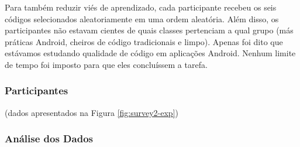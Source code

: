 Para também reduzir viés de aprendizado, cada participante recebeu os seis códigos selecionados aleatoriamente em uma ordem aleatória. Além disso, os participantes não estavam cientes de quais classes pertenciam a qual grupo (más práticas Android, cheiros de código tradicionais e limpo). Apenas foi dito que estávamos estudando qualidade de código em aplicações Android. Nenhum limite de tempo foi imposto para que eles concluíssem a tarefa.


\subsubsection{Participantes}
\label{sub:perception-participants}


 (dados apresentados na Figura \ref{fig:survey2-exp})


\subsubsection{Análise dos Dados}
\label{sub:perception-participants-analysis}


















